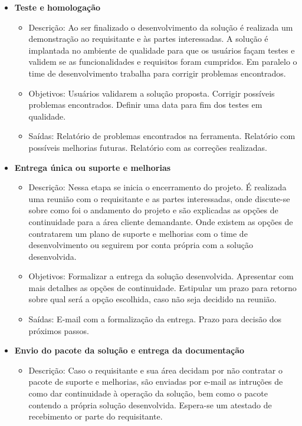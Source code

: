 \begin{itemize}
\begin{itemize}
		\end{itemize}
		\item \textbf{Teste e homologação}
		\begin{itemize}
			\item Descrição: Ao ser finalizado o desenvolvimento da solução é realizada um demonstração ao requisitante e às partes interessadas.
			A solução é implantada no ambiente de qualidade para que os usuários façam testes e validem se as funcionalidades e requisitos foram cumpridos.
			Em paralelo o time de desenvolvimento trabalha para corrigir problemas encontrados.
			\item Objetivos: Usuários validarem a solução proposta. Corrigir possíveis problemas encontrados. Definir uma data para fim dos testes em qualidade. 
			\item Saídas: Relatório de problemas encontrados na ferramenta. Relatório com possíveis melhorias futuras. Relatório com as correções realizadas.
		\end{itemize}
		\item \textbf{Entrega única ou suporte e melhorias}
		\begin{itemize}
			\item Descrição: Nessa etapa se inicia o encerramento do projeto. É realizada uma reunião com o requisitante e as partes interessadas, onde discute-se
			sobre como foi o andamento do projeto e são explicadas as opções de continuidade para a área cliente demandante. Onde existem as opções de contratarem 
			um plano de suporte e melhorias com o time de desenvolvimento ou seguirem por conta própria com a solução desenvolvida. 
			\item Objetivos: Formalizar a entrega da solução desenvolvida. Apresentar com mais detalhes as opções de continuidade. Estipular um prazo para retorno sobre qual será a opção escolhida, caso não seja decidido na reunião.
			\item Saídas: E-mail com a formalização da entrega. Prazo para decisão dos próximos passos.
		\end{itemize}
		\item \textbf{Envio do pacote da solução e entrega da documentação}
		\begin{itemize}
			\item Descrição: Caso o requisitante e sua área decidam por não contratar o pacote de suporte e melhorias, são enviadas por e-mail as intruções de como dar continuidade à operação da solução, bem como o pacote contendo a própria solução desenvolvida. Espera-se um atestado de recebimento or parte do requisitante.

\end{itemize}
\end{itemize}
